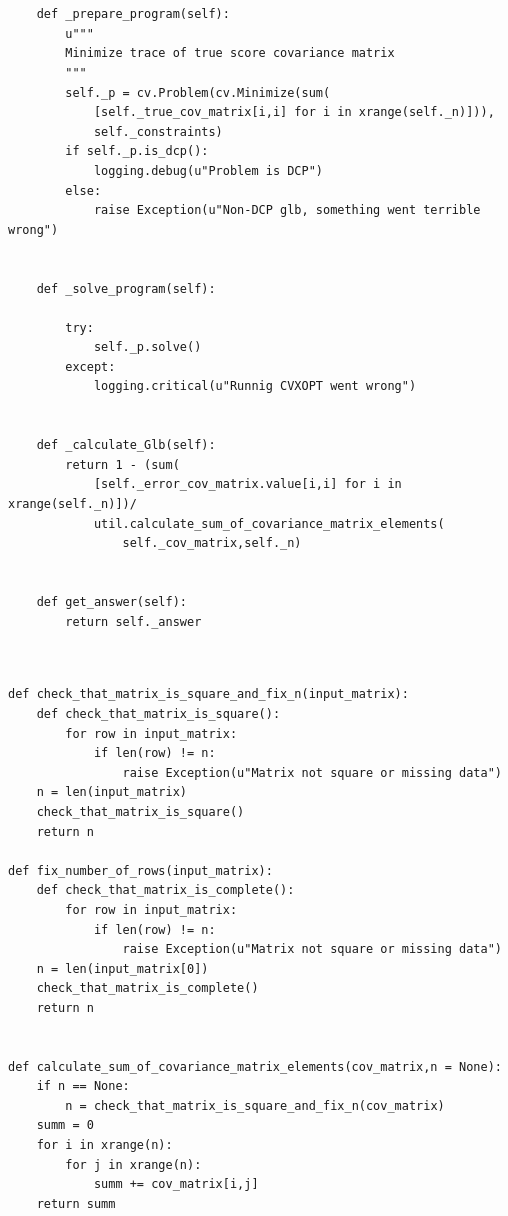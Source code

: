 \documentclass[a4paper,12pt,oneside]{article}
\newenvironment{customFloatWrap}{}{}
\numberwithin{equation}{section}
\theoremstyle{definition}
\begin{document}
\begin{customFloatWrap}
\begin{verbatim}
        
        
    def _prepare_program(self):
        u"""
        Minimize trace of true score covariance matrix
        """
        self._p = cv.Problem(cv.Minimize(sum(
            [self._true_cov_matrix[i,i] for i in xrange(self._n)])),
            self._constraints)
        if self._p.is_dcp():
            logging.debug(u"Problem is DCP")
        else:
            raise Exception(u"Non-DCP glb, something went terrible wrong")
            
            
    def _solve_program(self):

        try:
            self._p.solve()
        except:
            logging.critical(u"Runnig CVXOPT went wrong")
        
    
    def _calculate_Glb(self):
        return 1 - (sum(
        	[self._error_cov_matrix.value[i,i] for i in xrange(self._n)])/
            util.calculate_sum_of_covariance_matrix_elements(
                self._cov_matrix,self._n)
        

    def get_answer(self):
        return self._answer
        
\end{verbatim}
\end{customFloatWrap}

\vspace{10pt}

\begin{customFloatWrap}
\begin{verbatim}

def check_that_matrix_is_square_and_fix_n(input_matrix):      
    def check_that_matrix_is_square():   
        for row in input_matrix:
            if len(row) != n:
                raise Exception(u"Matrix not square or missing data")  
    n = len(input_matrix) 
    check_that_matrix_is_square()
    return n

def fix_number_of_rows(input_matrix):
    def check_that_matrix_is_complete():   
        for row in input_matrix:
            if len(row) != n:
                raise Exception(u"Matrix not square or missing data")
    n = len(input_matrix[0])
    check_that_matrix_is_complete()
    return n
    

def calculate_sum_of_covariance_matrix_elements(cov_matrix,n = None):
    if n == None:
        n = check_that_matrix_is_square_and_fix_n(cov_matrix)
    summ = 0
    for i in xrange(n):
        for j in xrange(n):
            summ += cov_matrix[i,j]
    return summ

\end{verbatim}
\end{customFloatWrap}
\end{document}
